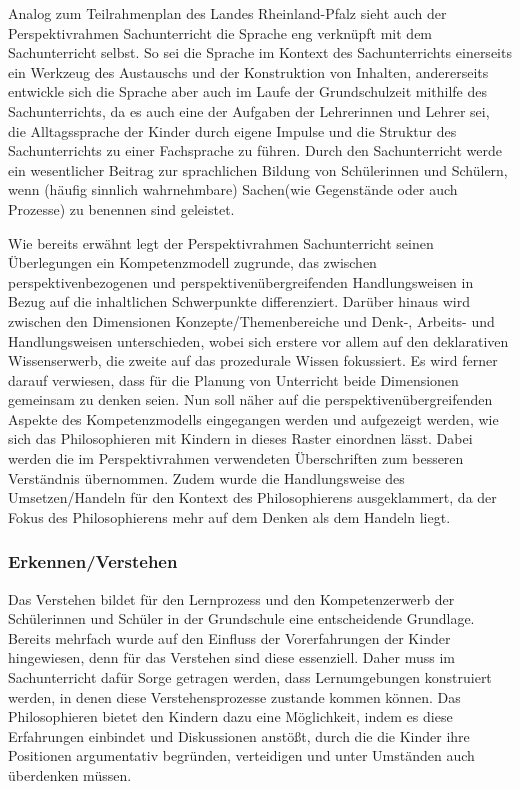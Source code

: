 Analog zum Teilrahmenplan des Landes Rheinland-Pfalz sieht auch der Perspektivrahmen Sachunterricht die Sprache eng verknüpft mit dem Sachunterricht selbst. 
So sei die Sprache im Kontext des Sachunterrichts einerseits ein Werkzeug des Austauschs und der Konstruktion von Inhalten, andererseits entwickle sich die Sprache aber auch im Laufe der Grundschulzeit mithilfe des Sachunterrichts, da es auch eine der Aufgaben der Lehrerinnen und Lehrer sei, die Alltagssprache der Kinder durch eigene Impulse und die Struktur des Sachunterrichts zu einer Fachsprache zu führen. 
Durch den Sachunterricht werde ein wesentlicher \glqq Beitrag zur sprachlichen Bildung von Schülerinnen und Schülern, wenn (häufig sinnlich wahrnehmbare) \glqq Sachen\grqq (wie Gegenstände oder auch Prozesse) zu benennen sind\grqq{}\cite[S.\,11]{GDS13} geleistet.

Wie bereits erwähnt legt der Perspektivrahmen Sachunterricht seinen Überlegungen ein Kompetenzmodell zugrunde, das zwischen perspektivenbezogenen und perspektivenübergreifenden Handlungsweisen in Bezug auf die inhaltlichen Schwerpunkte differenziert.
 Darüber hinaus wird zwischen den Dimensionen \glqq Konzepte/Themenbereiche\grqq{} und \glqq Denk-, Arbeits- und Handlungsweisen\grqq{} unterschieden, wobei sich erstere vor allem auf den deklarativen Wissenserwerb, die zweite auf das prozedurale Wissen fokussiert. 
 Es wird ferner darauf verwiesen, dass für die Planung von Unterricht beide Dimensionen gemeinsam zu denken seien.
 Nun soll näher auf die perspektivenübergreifenden Aspekte des Kompetenzmodells eingegangen werden und aufgezeigt werden, wie sich das Philosophieren mit Kindern in dieses Raster einordnen lässt. 
 Dabei werden die im Perspektivrahmen verwendeten Überschriften zum besseren Verständnis übernommen. 
Zudem wurde die Handlungsweise des Umsetzen/Handeln für den Kontext des Philosophierens ausgeklammert, da der Fokus des Philosophierens mehr auf dem Denken als dem Handeln liegt.

\newpage

\subsubsection{Erkennen/Verstehen}


Das Verstehen bildet für den Lernprozess und den Kompetenzerwerb der Schülerinnen und Schüler in der Grundschule eine entscheidende Grundlage. 
Bereits mehrfach wurde auf den Einfluss der Vorerfahrungen der Kinder hingewiesen, denn für das Verstehen sind diese essenziell. 
Daher muss im Sachunterricht dafür Sorge getragen werden, dass Lernumgebungen konstruiert werden, in denen diese Verstehensprozesse zustande kommen können. 
Das Philosophieren bietet den Kindern dazu eine Möglichkeit, indem es diese Erfahrungen einbindet und Diskussionen anstößt, durch die die Kinder ihre Positionen argumentativ begründen, verteidigen und unter Umständen auch überdenken müssen. 

